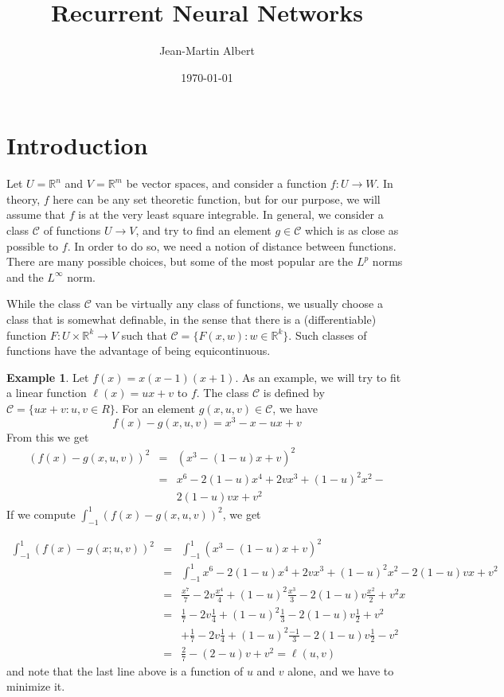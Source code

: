 \documentclass[10pt]{amsart}
\newcommand{\R}{\mathbb{R}}
\newcommand{\C}{\mathcal{C}}
\theoremstyle{definition}
\newtheorem{example}[theorem]{Example}
\begin{document}
\title{Recurrent Neural Networks}
\author{Jean-Martin Albert}
\date{\today}
\maketitle


 \section{Introduction}

 Let $U=\R^n$ and $V=\R^m$ be vector spaces, and consider a function $f:U\to W$.
 In theory, $f$ here can be any set theoretic function, but for our purpose, we
 will assume that $f$ is at the very least square integrable. In general, we
 consider a class $\C$ of functions $U\to V$, and try to find an element $g\in\C$
 which is as close as possible to $f$.  In order to do so, we need a notion of distance
 between functions.  There are many possible choices, but some of the most popular are
 the $L^p$ norms and the $L^\infty$ norm.

 While the class $\C$ van be virtually any class of functions, we usually choose a class
 that is somewhat definable, in the sense that there is a (differentiable) function $F:U\times\R^k\to V$
 such that $\C=\{F(x, w): w\in \R^k\}$.  Such classes of functions have the advantage of
 being equicontinuous.


 \begin{example}
 Let $f(x)=x(x-1)(x+1)$.  As an example, we will try to fit a linear function
 $\ell(x)=ux+v$ to $f$.  The class $\C$ is defined by $\C=\{ux+v:u,v\in R\}$.
 For an element $g(x, u, v)\in\C$, we have $$f(x)-g(x,u,v) = x^3-x - ux+v$$
 From this we get
 \begin{eqnarray*}
   (f(x)-g(x,u,v))^2 &=& (x^3 - (1-u)x + v)^2 \\
   {} &=& x^6 - 2(1-u)x^4 + 2vx^3 + (1-u)^2x^2 - \\
   {} & & 2(1-u)vx + v^2
 \end{eqnarray*}
 If we compute $\int_{-1}^1 (f(x)-g(x,u,v))^2$, we get

 \begin{eqnarray*}
   \int_{-1}^1(f(x)-g(x; u,v))^2 &=& \int_{-1}^1(x^3 - (1-u)x + v)^2 \\
   {} &=& \int_{-1}^1x^6 - 2(1-u)x^4 + 2vx^3 + (1-u)^2x^2 - 2(1-u)vx + v^2\\
   {} &=& \frac{x^7}{7}-2v\frac{x^4}{4} + (1-u)^2\frac{x^3}{3} - 2(1-u)v\frac{x^2}{2}+v^2x\\
   {} &=& \frac{1}{7}-2v\frac{1}{4} + (1-u)^2\frac{1}{3} - 2(1-u)v\frac{1}{2}+v^2\\
   {} & & +\frac{1}{7}-2v\frac{1}{4} + (1-u)^2\frac{-1}{3} - 2(1-u)v\frac{1}{2}-v^2\\
   {} &=& \frac{2}{7} - (2-u)v+v^2 = \ell(u,v)
 \end{eqnarray*}
 and note that the last line above is a function of $u$ and $v$ alone, and we have to minimize it.
 \end{example}
\end{document}
